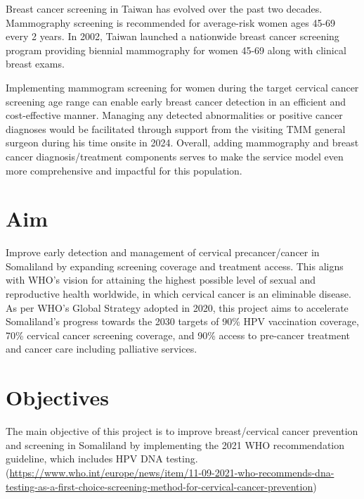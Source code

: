 \documentclass{article}
\begin{document}
Breast cancer screening in Taiwan has evolved over the past two decades. Mammography screening is recommended for average-risk women ages 45-69 every 2 years. In 2002, Taiwan launched a nationwide breast cancer screening program providing biennial mammography for women 45-69 along with clinical breast exams.


Implementing mammogram screening for women during the target cervical cancer screening age range can enable early breast cancer detection in an efficient and cost-effective manner. Managing any detected abnormalities or positive cancer diagnoses would be facilitated through support from the visiting TMM general surgeon during his time onsite in 2024. Overall, adding mammography and breast cancer diagnosis/treatment components serves to make the service model even more comprehensive and impactful for this population.


\section{Aim}

Improve early detection and management of cervical precancer/cancer in Somaliland by expanding screening coverage and treatment access. This aligns with WHO’s vision for attaining the highest possible level of sexual and reproductive health worldwide, in which cervical cancer is an eliminable disease.
As per WHO's Global Strategy adopted in 2020, this project aims to accelerate Somaliland’s progress towards the 2030 targets of 90\% HPV vaccination coverage, 70\% cervical cancer screening coverage, and 90\% access to pre-cancer treatment and cancer care including palliative services. 




\section{Objectives}

The main objective of this project is to improve breast/cervical cancer prevention and screening in Somaliland by implementing the 2021 WHO recommendation guideline, which includes HPV DNA testing. (\url{https://www.who.int/europe/news/item/11-09-2021-who-recommends-dna-testing-as-a-first-choice-screening-method-for-cervical-cancer-prevention})
\end{document}
